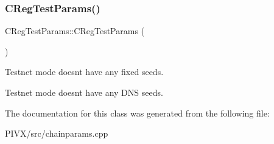 \subsubsection{\texorpdfstring{C\+Reg\+Test\+Params()}{CRegTestParams()}}
{\footnotesize\ttfamily C\+Reg\+Test\+Params\+::\+C\+Reg\+Test\+Params (\begin{DoxyParamCaption}{ }\end{DoxyParamCaption})\hspace{0.3cm}{\ttfamily [inline]}}

Testnet mode doesn\textquotesingle{}t have any fixed seeds.

Testnet mode doesn\textquotesingle{}t have any D\+NS seeds. 

The documentation for this class was generated from the following file\+:\begin{DoxyCompactItemize}
\item 
P\+I\+V\+X/src/chainparams.\+cpp\end{DoxyCompactItemize}
